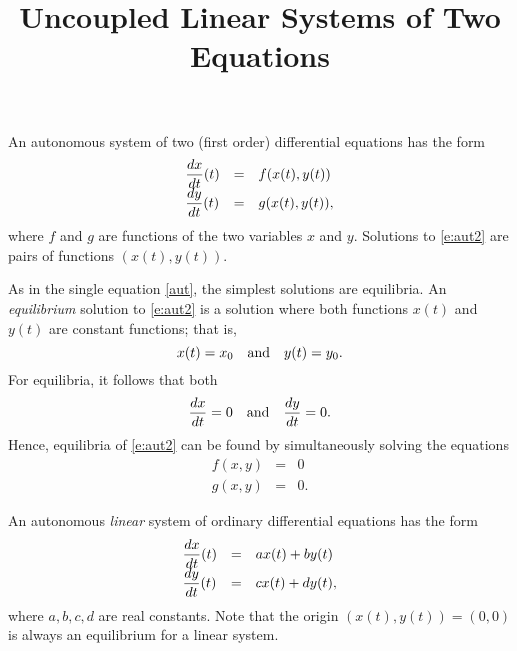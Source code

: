 \documentclass{ximera}
\title{Uncoupled Linear Systems of Two Equations}
\begin{document}
\begin{abstract}
\end{abstract}
\maketitle


\label{sec:UncoupledLS}

An autonomous system of two (first order) 
differential equations 
has the form
\renewcommand{\arraystretch}{1.8}
\begin{equation} \label{e:aut2}
\begin{array}{lll}
\displaystyle \frac{dx}{dt}(t)  & = & f(x(t),y(t)) \\
\displaystyle \frac{dy}{dt}(t)  & = & g(x(t),y(t)),
\end{array}
\end{equation}
where $f$ and $g$ are functions of the two variables $x$
and $y$.  Solutions to \eqref{e:aut2} are pairs of functions
$(x(t),y(t))$.

As in the single equation \eqref{aut}, the simplest
solutions are equilibria.  An {\em equilibrium\/} 
solution to
\eqref{e:aut2} is a solution where both functions $x(t)$
and $y(t)$ are constant functions; that is,
\[
x(t) = x_0 \quad\mbox{and}\quad  y(t)=y_0.
\]
For equilibria, it follows that both
\[
\frac{dx}{dt} = 0 \quad\mbox{and}\quad \frac{dy}{dt} = 0.
\]
Hence, equilibria of \eqref{e:aut2} can be found by
simultaneously solving the equations
\begin{eqnarray*}
f(x,y) & = & 0 \\
g(x,y) & = & 0.
\end{eqnarray*}

An autonomous {\em linear\/} system  of ordinary
differential equations 
has the form
\renewcommand{\arraystretch}{1.8}
\begin{equation} \label{e:autlin}
\begin{array}{lll}
\displaystyle \frac{dx}{dt}(t)  & = & a x(t) + b y(t) \\
\displaystyle \frac{dy}{dt}(t)  & = & c x(t) + d y(t),
\end{array}
\end{equation}
\renewcommand{\arraystretch}{1.0}%
where $a,b,c,d$ are real constants.  Note that the origin
$(x(t),y(t))=(0,0)$ is always an equilibrium for a linear
system.
\end{document}
